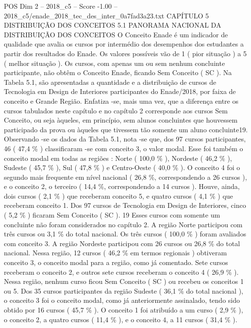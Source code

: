 \begin{textsample}{POS Dim 2 – 2018\_c5 – Score -1.00 – 2018\_c5/enade\_2018\_tec\_des\_inter\_0a7fad3a23.txt}  \label{ex:f2_pos_322}
CAPÍTULO 5 DISTRIBUIÇÃO DOS CONCEITOS 5.1 PANORAMA NACIONAL DA DISTRIBUIÇÃO DOS CONCEITOS O Conceito Enade é um indicador de qualidade que avalia os cursos por intermédio dos desempenhos dos estudantes a partir dos resultados do Enade.
Os valores possíveis vão de 1 ( pior situação ) a 5 ( melhor situação ).
Os cursos, com apenas um ou sem nenhum concluinte participante, não obtêm o Conceito Enade, ficando Sem Conceito ( SC ).
Na Tabela 5.1, são apresentadas a quantidade e a distribuição de cursos de Tecnologia em Design de Interiores participantes do Enade/2018, por faixa de conceito e Grande Região.
Enfatiza -se, mais uma vez, que a diferença entre os cursos tabulados neste capítulo e no capítulo 2 corresponde aos cursos Sem Conceito, ou seja àqueles, em princípio, sem alunos concluintes que houvessem participado da prova ou àqueles que tivessem tão somente um aluno concluinte19.
Observando -se os dados da Tabela 5.1, nota -se que, dos 97 cursos participantes, 46 ( 47,4 \% ) classificaram -se com conceito 3, o valor modal.
Esse foi também o conceito modal em todas as regiões : Norte ( 100,0 \% ), Nordeste ( 46,2 \% ), Sudeste ( 45,7 \% ), Sul ( 47,8 \% ) e Centro-Oeste ( 40,0 \% ).
O conceito 4 foi o segundo mais frequente em nível nacional ( 26,8 \%, correspondendo a 26 cursos ), e o conceito 2, o terceiro ( 14,4 \%, correspondendo a 14 cursos ).
Houve, ainda, dois cursos ( 2,1 \% ) que receberam conceito 5, e quatro cursos ( 4,1 \% ) que receberam conceito 1.
Dos 97 cursos de Tecnologia em Design de Interiores, cinco ( 5,2 \% ) ficaram Sem Conceito ( SC ). 19 Esses cursos com somente um concluinte não foram considerados no capítulo 2.
A região Norte participou com três cursos ou 3,1 \% do total nacional.
Os três cursos ( 100,0 \% ) foram avaliados com conceito 3.
A região Nordeste participou com 26 cursos ou 26,8 \% do total nacional.
Nessa região, 12 cursos ( 46,2 \% em termos regionais ) obtiveram conceito 3, o conceito modal para a região, como já comentado.
Sete cursos receberam o conceito 2, e outros sete cursos receberam o conceito 4 ( 26,9 \% ).
Nessa região, nenhum curso ficou Sem Conceito ( SC ) ou recebeu os conceitos 1 ou 5.
Dos 35 cursos participantes da região Sudeste ( 36,1 \% do total nacional ), o conceito 3 foi o conceito modal, como já anteriormente assinalado, tendo sido obtido por 16 cursos ( 45,7 \% ).
O conceito 1 foi atribuído a um curso ( 2,9 \% ), o conceito 2, a quatro cursos ( 11,4 \% ), e o conceito 4, a 11 cursos ( 31,4 \% ).

\end{textsample}
